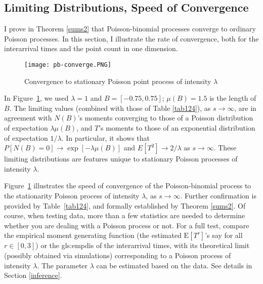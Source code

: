 \documentclass[10pt]{article}
\begin{document}
\subsection{Limiting Distributions, Speed of Convergence}\label{convpoisson}

I prove in Theorem \ref{sums2} that Poisson-binomial processes converge to ordinary Poisson processes. In this section, I illustrate the rate of convergence, both for the interarrival times and the point count in one dimension.

\begin{figure}[H]
\centering
\texttt{[image: pb-converge.PNG]}
\caption{Convergence to stationary Poisson point process of intensity $\lambda$}
\label{fig:pbconverge}
\end{figure}
In Figure~\ref{fig:pbconverge}, we used $\lambda=1$ and $B=[-0.75, 0.75]$; $\mu(B)=1.5$ is the length of $B$. The limiting values (combined with those of Table \ref{tab124}), as $s\rightarrow\infty$, are in agreement with $N(B)$'s moments converging to those of a Poisson distribution of expectation $\lambda\mu(B)$, and $T$'s moments to those of an exponential distribution of expectation $1/\lambda$.
In particular, it shows that $P[N(B)=0]\rightarrow\exp[-\lambda\mu(B)]$ and $E[T^2]\rightarrow 2/\lambda$  as $s\rightarrow\infty$.
These limiting distributions are features unique to stationary Poisson processes of intensity $\lambda$.

Figure~\ref{fig:pbconverge} illustrates the speed of convergence of the Poisson-binomial process to the stationarity Poisson process of intensity $\lambda$, as $s\rightarrow\infty$. Further confirmation is provided by Table~\ref{tab124}, and formally established by Theorem \ref{sums2}. Of course, when testing data, more than a few statistics are needed to determine whether you are dealing with a Poisson process or not. For a full test, compare the empirical \textcolor{index}{moment generating function} (the estimated $\mbox{E}[T^r]$'s say for all $r\in[0,3]$) or the \gls{gls:empdis} of the interarrival times, with its theoretical limit (possibly obtained via simulations) corresponding to a Poisson process of intensity $\lambda$. The parameter $\lambda$ can be estimated based on the data. See details in Section \ref{inference}.
\end{document}
